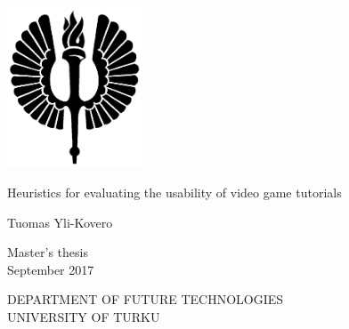 \documentclass[12pt, a4paper]{report}
\begin{document}
\pagestyle{empty}
\begin{center}
	\includegraphics[width=4cm]{soihtu.png}
\end{center}
\vspace{3.0cm}
\begin{center}\large
Heuristics for evaluating the usability of video game tutorials
\end{center}


\vspace{0.5cm}
\begin{center}
	Tuomas Yli-Kovero
\end{center}

\vspace{0.5cm}
\begin{center}
	Master's thesis\\
	September 2017
\end{center}

\vspace{5.0cm}
\begin{center}
	DEPARTMENT OF FUTURE TECHNOLOGIES\\
	UNIVERSITY OF TURKU\\
\end{center}
\end{document}
